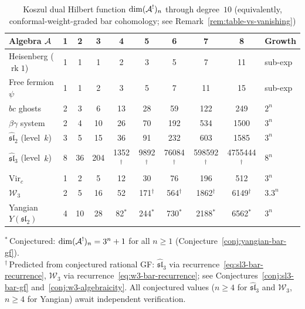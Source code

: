 \begin{table}[ht]
\centering
\caption{Koszul dual Hilbert function $\dim (\mathcal{A}^!)_n$ through degree~$10$
(equivalently, conformal-weight-graded bar cohomology;
see Remark~\ref{rem:table-vs-vanishing})}
\label{tab:bar-dimensions}
\renewcommand{\arraystretch}{1.4}
{\scriptsize
\begin{tabular}{|l|c|c|c|c|c|c|c|c|l|}
\hline
\textbf{Algebra $\mathcal{A}$}
  & \textbf{1} & \textbf{2} & \textbf{3}
  & \textbf{4} & \textbf{5} & \textbf{6}
  & \textbf{7} & \textbf{8}
  & \textbf{Growth} \\
\hline
Heisenberg ($\operatorname{rk}1$)
  & 1 & 1 & 1 & 2 & 3 & 5 & 7 & 11 & sub-exp \\
\hline
Free fermion $\psi$
  & 1 & 1 & 2 & 3 & 5 & 7 & 11 & 15 & sub-exp \\
\hline
$bc$ ghosts
  & 2 & 3 & 6 & 13 & 28 & 59 & 122 & 249 & $2^n$ \\
\hline
$\beta\gamma$ system
  & 2 & 4 & 10 & 26 & 70 & 192 & 534 & 1500 & $3^n$ \\
\hline
$\widehat{\mathfrak{sl}}_2$ (level~$k$)
  & 3 & 5 & 15 & 36 & 91 & 232 & 603 & 1585 & $3^n$ \\
\hline
$\widehat{\mathfrak{sl}}_3$ (level~$k$)
  & 8 & 36 & 204 & 1352$^\dagger$ & 9892$^\dagger$ & 76084$^\dagger$ & 598592$^\dagger$ & 4755444$^\dagger$ & $8^n$ \\
\hline
$\mathrm{Vir}_c$
  & 1 & 2 & 5 & 12 & 30 & 76 & 196 & 512 & $3^n$ \\
\hline
$\mathcal{W}_3$
  & 2 & 5 & 16 & 52 & 171$^\dagger$ & 564$^\dagger$ & 1862$^\dagger$ & 6149$^\dagger$ & $3.3^n$ \\
\hline
Yangian $Y(\mathfrak{sl}_2)$
  & 4 & 10 & 28 & 82$^*$ & 244$^*$ & 730$^*$ & 2188$^*$ & 6562$^*$ & $3^n$ \\
\hline
\end{tabular}
}

\medskip
\noindent
{\footnotesize $^*$\,Conjectured: $\dim (\mathcal{A}^!)_n = 3^n + 1$
for all $n \geq 1$
(Conjecture~\ref{conj:yangian-bar-gf}).\\
$^\dagger$\,Predicted from conjectured rational GF\@:
$\widehat{\mathfrak{sl}}_3$ via recurrence~\eqref{eq:sl3-bar-recurrence},
$\mathcal{W}_3$ via recurrence~\eqref{eq:w3-bar-recurrence};
see Conjectures~\ref{conj:sl3-bar-gf}
and~\ref{conj:w3-algebraicity}.
All conjectured values ($n \geq 4$ for
$\widehat{\mathfrak{sl}}_3$ and $\mathcal{W}_3$,
$n \geq 4$ for Yangian) await independent verification.}
\end{table}

